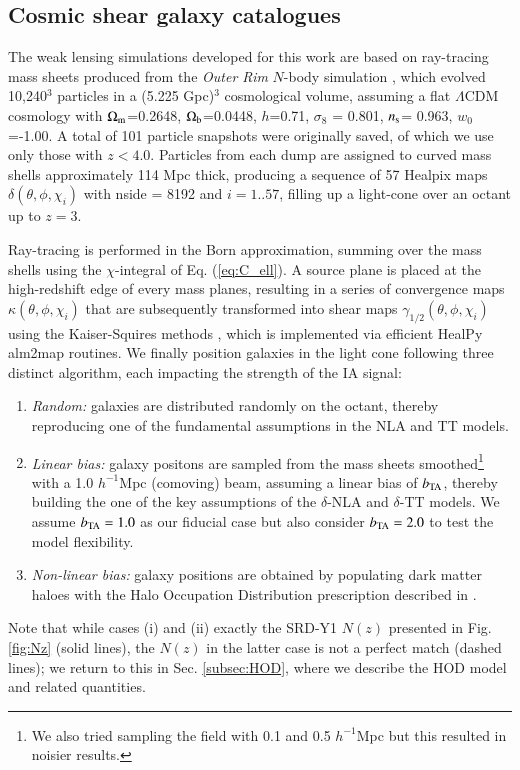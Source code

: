 \documentclass[useAMS,usenatbib]{mn2e}
\begin{document}
\subsection{Cosmic shear galaxy catalogues} 
\label{subsec:WL_cats}

The weak lensing simulations developed for this work are based on ray-tracing mass sheets produced from the {\it Outer Rim} $N$-body simulation \citep{OuterRim}, which evolved 10,240$^3$ particles in a (5.225 Gpc)$^3$ cosmological volume, assuming a flat $\Lambda$CDM cosmology with $\Omega_{\rm m}$=0.2648, $\Omega_{\rm b}$=0.0448, $h$=0.71, $\sigma_8$ = 0.801, $n_{\rm s}$= 0.963, $w_0$=-1.00. A total of 101 particle snapshots were originally saved, of which we use only those with $z<4.0$. Particles from each dump are assigned to curved mass shells approximately 114 Mpc thick, producing a sequence of 57 {\sc Healpix} maps $\delta(\theta,\phi,\chi_i)$ with {\sc nside} = 8192 and $i=1..57$, filling up a light-cone over an octant up to $z=3$. %

Ray-tracing is performed in the Born approximation, summing over the mass shells using the $\chi$-integral of Eq. (\ref{eq:C_ell}). A source plane is placed at the high-redshift edge of every mass planes, resulting in a series of convergence  maps  $\kappa(\theta,\phi,\chi_i)$ that are subsequently transformed into shear maps $\gamma_{1/2}(\theta,\phi,\chi_i)$ using the Kaiser-Squires methods \citep{KaiserSquires}, which is implemented via efficient {\sc HealPy alm2map} routines. We finally position galaxies in the light cone following three distinct algorithm, each impacting the strength of the IA signal:
\begin{enumerate}
\item {\it Random:} galaxies are distributed randomly on the octant, thereby reproducing one of the  fundamental assumptions in the NLA and TT models. 
\item {\it Linear bias:} galaxy positons are sampled from the mass sheets smoothed\footnote{We also tried sampling the field with 0.1 and 0.5 $h^{-1}$Mpc but this resulted in noisier results.} with a  1.0 $h^{-1}$Mpc (comoving) beam, assuming a linear bias of $b_{\rm TA}$, thereby building the one of the key assumptions of the $\delta$-NLA and $\delta$-TT models. We assume $b_{\rm TA}=1.0$ as our fiducial case but also consider $b_{\rm TA}=2.0$ to test  the  model flexibility. 
\item{\it Non-linear bias:} galaxy positions are obtained by populating dark matter haloes with the Halo Occupation Distribution prescription described in \citet{cosmoDC2}. 
\end{enumerate}
Note that while cases (i) and (ii) exactly the SRD-Y1 $N(z)$ presented in Fig. \ref{fig:Nz} (solid lines), the $N(z)$ in the latter case is not a perfect match (dashed lines); we return to this in Sec. \ref{subsec:HOD}, where we describe the HOD model and related quantities.  
\end{document}
